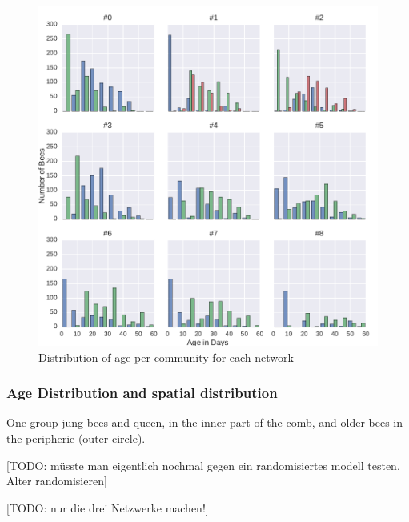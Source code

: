 \begin{figure}[htb]
	\centering
	\includegraphics[width=1.0\textwidth]{Figures/ageDistribution}
	\caption{Distribution of age per community for each network}
	\label{fig:ageDist}
\end{figure}


\subsubsection{Age Distribution and spatial distribution}
One group jung bees and queen, in the inner part of the comb, and older bees in the peripherie (outer circle).

[TODO: müsste man eigentlich nochmal gegen ein randomisiertes modell testen. Alter randomisieren]

[TODO: nur die drei Netzwerke machen!]